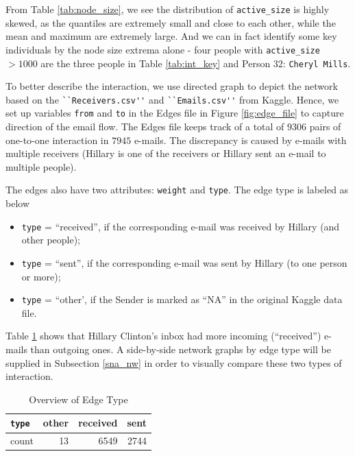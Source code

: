 \documentclass[11pt]{article}
\begin{document}
From Table \ref{tab:node_size}, we see the distribution of \verb+active_size+ is highly skewed, as the quantiles are extremely small and close to each other, while the mean and maximum are extremely large. And we can in fact identify some key individuals by the node size extrema alone - four people with \verb+active_size+ $> 1000$ are the three people in Table \ref{tab:int_key} and Person 32: \verb+Cheryl Mills+.

To better describe the interaction, we use directed graph to depict the network based on the \verb+``Receivers.csv''+ and \verb+``Emails.csv''+ from Kaggle. Hence, we set up variables \verb+from+ and \verb+to+ in the Edges file in Figure \ref{fig:edge_file} to capture direction of the email flow. The Edges file keeps track of a total of $9306$ pairs of one-to-one interaction in $7945$ e-mails. The discrepancy is caused by e-mails with multiple receivers (Hillary is one of the receivers or Hillary sent an e-mail to multiple people).

The edges also have two attributes: \verb+weight+ and \verb+type+. The edge type is labeled as below  
\begin{itemize}
\item \verb+type+ = ``received'', if the corresponding e-mail was received by Hillary (and other people);
\item \verb+type+ = ``sent'', if the corresponding e-mail was sent by Hillary (to one person or more);
\item \verb+type+ = ``other', if the Sender is marked as ``NA'' in the original Kaggle data file.
\end{itemize}

Table \ref{tab:edge_type} shows that Hillary Clinton's inbox had more incoming (``received'') e-mails than outgoing ones. A side-by-side network graphs by edge type  will be supplied in Subsection \ref{sna_nw} in order to visually compare these two types of interaction.  
\begin{table}[ht]
\caption{Overview of Edge Type}
\label{tab:edge_type}
\centering
\begin{tabular}{l | r r r}
\verb+type+ & other & received & sent\\ \hline 
count & 13 & 6549 &2744
\end{tabular}
\end{table}
\end{document}
